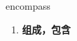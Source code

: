 
\begin{frame}
{\huge encompass}
\begin{center}
\begin{enumerate}\Large
  \item \textbf{组成，包含}
\end{enumerate}
\end{center}
\end{frame}
